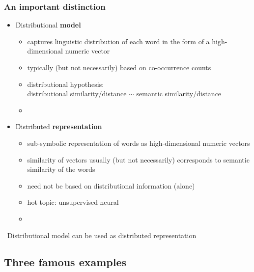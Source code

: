\documentclass[t]{beamer} %
\begin{document}
\begin{frame}
  \frametitle{An important distinction}

  \begin{itemize}
  \item<1-> \h{Distributional} \textbf{model}
    \begin{itemize}
    \item captures linguistic distribution of each word in the form of a high-dimensional numeric vector
    \item typically (but not necessarily) based on co-occurrence counts
    \item distributional hypothesis:\\
      distributional similarity/distance $\sim$ semantic similarity/distance
    \item[]
    \end{itemize}
  \item<2-> \h{Distributed} \textbf{representation}
    \begin{itemize}
    \item sub-symbolic representation of words as high-dimensional numeric vectors
    \item similarity of vectors usually (but not necessarily) corresponds to semantic similarity of the words
    \item need not be based on distributional information (alone)
    \item hot topic: unsupervised neural 
    \item[]
    \end{itemize}
  \end{itemize}
  
  \hand\ Distributional model can be used as distributed representation

\end{frame}

\subsection{Three famous examples}
\end{document}

